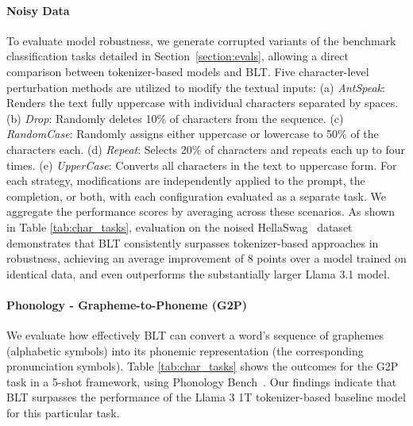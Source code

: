 \paragraph{Noisy Data} To evaluate model robustness, we generate corrupted variants of the benchmark classification tasks detailed in Section~\ref{section:evals}, allowing a direct comparison between tokenizer-based models and {\textsc BLT}. Five character-level perturbation methods are utilized to modify the textual inputs: (a) \textit{AntSpeak}: Renders the text fully uppercase with individual characters separated by spaces. (b) \textit{Drop}: Randomly deletes 10\% of characters from the sequence. (c) \textit{RandomCase}: Randomly assigns either uppercase or lowercase to 50\% of the characters each. (d) \textit{Repeat}: Selects 20\% of characters and repeats each up to four times. (e) \textit{UpperCase}: Converts all characters in the text to uppercase form. For each strategy, modifications are independently applied to the prompt, the completion, or both, with each configuration evaluated as a separate task. We aggregate the performance scores by averaging across these scenarios. As shown in Table \ref{tab:char_tasks}, evaluation on the noised HellaSwag~\citep{Eval_hellaswag} dataset demonstrates that {\textsc BLT} consistently surpasses tokenizer-based approaches in robustness, achieving an average improvement of 8 points over a model trained on identical data, and even outperforms the substantially larger Llama 3.1 model.

\paragraph{Phonology - Grapheme-to-Phoneme (G2P)} We evaluate how effectively {\textsc BLT} can convert a word's sequence of graphemes (alphabetic symbols) into its phonemic representation (the corresponding pronunciation symbols). Table \ref{tab:char_tasks} shows the outcomes for the G2P task in a 5-shot framework, using Phonology Bench~\citep{suvarna2024phonologybench}. Our findings indicate that {\textsc BLT} surpasses the performance of the Llama 3 1T tokenizer-based baseline model for this particular task.

